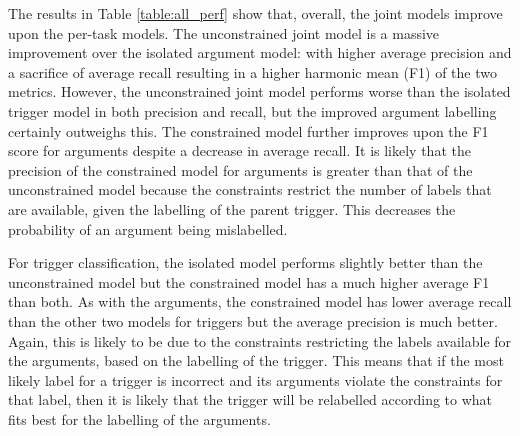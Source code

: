\documentclass{article} %
\begin{document}
\begin{table}[htb]
\centering
\caption{Performance of models}
\label{table:all_perf}
\end{table}
The results in Table \ref{table:all_perf} show that, overall, the joint models improve upon the per-task models. The unconstrained joint model is a massive improvement over the isolated argument model: with higher average precision and a sacrifice of average recall resulting in a higher harmonic mean (F1) of the two metrics. However, the unconstrained joint model performs worse than the isolated trigger model in both precision and recall, but the improved argument labelling certainly outweighs this. The constrained model further improves upon the F1 score for arguments despite a decrease in average recall. It is likely that the precision of the constrained model for arguments is greater than that of the unconstrained model because the constraints restrict the number of labels that are available, given the labelling of the parent trigger. This decreases the probability of an argument being mislabelled.

For trigger classification, the isolated model performs slightly better than the unconstrained model but the constrained model has a much higher average F1 than both. As with the arguments, the constrained model has lower average recall than the other two models for triggers but the average precision is much better. Again, this is likely to be due to the constraints restricting the labels available for the arguments, based on the labelling of the trigger. This means that if the most likely label for a trigger is incorrect and its arguments violate the constraints for that label, then it is likely that the trigger will be relabelled according to what fits best for the labelling of the arguments.
\end{document}
